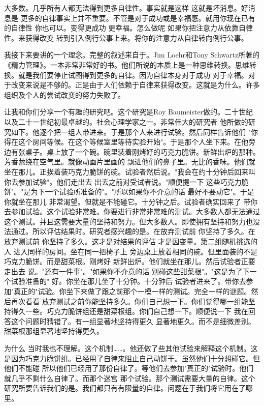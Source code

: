 大多数。几乎所有人都无法得到更多自律性。事实就是这样 这就是坏消息。好消息是 更多的自律事实上并不重要。不管是对于成功或是幸福感。就用你现在已有的自律性 你也可以。变得更成功 更幸福。怎么做呢 如果你把注意力从依靠自律性。来获得改变 转到引入例行公事上来。将你的注意力从自律转向例行公事。 

我接下来要讲的一个理念。完整的叙述来自于。Jim Loehr和Tony Schwartz所著的《精力管理》。一本非常非常好的书。他们所说的本质上是一种思维转换。思维转换。就是我们要停止试图得到更多的自律。因为自律本身对于成功 对于幸福。对于改变来说是不够的。正是由于人们依赖于自律来获得改变。这就是为什么。许多组织及个人的尝试改变的努力失败了。 

让我和你们分享一个有趣的研究吧。这个研究是Roy Baumeister做的。二十世纪以及二十一世纪初最卓越的。社会心理学家之一。非常伟大的研究者 他所做的研究如下。他逐个把一组人带进来。于是那个人来进行试验。然后同样告诉他们 "你得在这个房间等候。在这个等候室里等待实验开始"。于是那个人坐下来。在他旁边有张桌子。桌上放了一个碗。碗里装着刚烤好的巧克力脆饼。新鲜出炉的那种。芳香萦绕在空气里。就像动画片里画的 飘进他们的鼻子里。无比的香味。他们就坐在那儿。正挨着装巧克力脆饼的碗。试验者然后说。"我会在约十分钟后回来叫你去参加试验"。他们走出去 出去之前对受试者说。"顺便提一下 这些巧克力脆饼"。"是为下一个试验所准备的"。"所以如果你不介意的话 最好不要动它"。于是你就坐在那儿 非常渴望。但就是不能碰它。十分钟之后。试验者确实回来了 带你去参加试验。这个试验非常难。你要进行非常非常难的测试。大多数人都无法通过这个测试。并且这需要大量的坚持和努力。但大多数人。即使拥有坚持和努力也没法通过。所以评估结果时。研究者感兴趣的是。在放弃测试前 你坚持了多久。在放弃测试前 你坚持了多久。这才是对结果的评估 才是因变量。第二组随机挑选的人 进入同样的房间。坐在同一把椅子上 旁边桌上放着相同的碗。但里面装的不是巧克力脆饼。而是甜菜根。刚烤好 新鲜出炉。他们就坐在那儿。然后试验者正要走出去 说。"还有一件事"。"如果你不介意的话 别碰这些甜菜根"。"这是为了下一个试验准备的" 好。你坐在那儿坐了十分钟。十分钟后 试验者进来了。带你去参加"真正的"试验。你坐下来做了跟之前那个一模一样的测试。完全一样的谜题。然后再次看看 放弃测试之前你能坚持多久。你们自己想一下。你们觉得哪一组能坚持得久一些。巧克力脆饼组还是甜菜根组。你们自己想一下。顺便说一下 我在回答这个问题时猜错了。有一组显著地坚持得更久 显著地更久。而不是细微差别。甜菜根那组显著地坚持得更久。 

为什么 当时我也不理解。这个机制……。他还做了些其他试验来解释这个机制。这是因为巧克力脆饼组。已经用了自律来阻止自己动饼干。虽然他们十分想碰它。但他们不能碰 所以他们已经用了那份自律了。等他们去参加"真正的"试验时。他们就几乎不剩什么自律了。而那个迷宫 那个试验。那个测试需要大量的自律。这个研究所要告诉我们的是。我们都只有有限量的自律。问题在于我们将它用在了哪里。 

